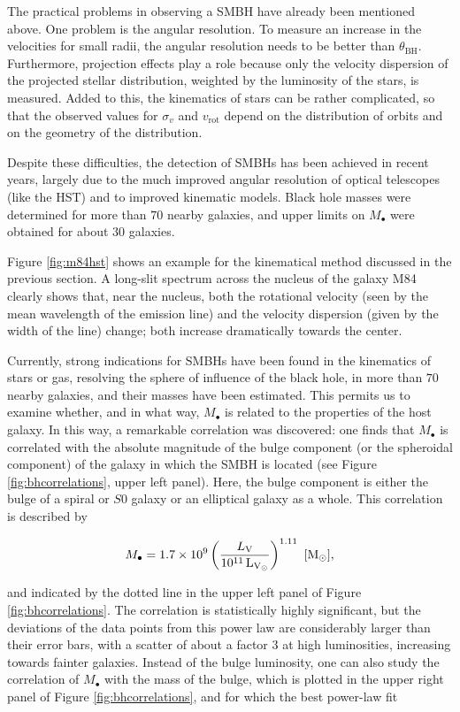 \documentclass[a4paper,10pt]{article}
\begin{document}
{\noindent}The practical problems in observing a SMBH have already been mentioned above. One problem is the angular resolution. To measure an increase in the velocities for small radii, the angular resolution needs to be better than $\theta_\mathrm{BH}$. Furthermore, projection effects play a role because only the velocity dispersion of the projected stellar distribution, weighted by the luminosity of the stars, is measured. Added to this, the kinematics of stars can be rather complicated, so that the observed values for $\sigma_v$ and $v_\mathrm{rot}$ depend on the distribution of orbits and on the geometry of the distribution.

{\noindent}Despite these difficulties, the detection of SMBHs has been achieved in recent years, largely due to the much improved angular resolution of optical telescopes (like the HST) and to improved kinematic models. Black hole masses were determined for more than $70$ nearby galaxies, and upper limits on $M_\bullet$ were obtained for about $30$ galaxies.

{\noindent}Figure \ref{fig:m84hst} shows an example for the kinematical method discussed in the previous section. A long-slit spectrum across the nucleus of the galaxy M84 clearly shows that, near the nucleus, both the rotational velocity (seen by the mean wavelength of the emission line) and the velocity dispersion (given by the width of the line) change; both increase dramatically towards the center.

{\noindent}Currently, strong indications for SMBHs have been found in the kinematics of stars or gas, resolving the sphere of influence of the black hole, in more than $70$ nearby galaxies, and their masses have been estimated. This permits us to examine whether, and in what way, $M_\bullet$ is related to the properties of the host galaxy. In this way, a remarkable correlation was discovered: one finds that $M_\bullet$ is correlated with the absolute magnitude of the bulge component (or the spheroidal component) of the galaxy in which the SMBH is located (see Figure \ref{fig:bhcorrelations}, upper left panel). Here, the bulge component is either the bulge of a spiral or $S0$ galaxy or an elliptical galaxy as a whole. This correlation is described by

\begin{align*}
    M_\bullet = 1.7\times10^9\left(\frac{L_\mathrm{V}}{10^{11}\,{\rm L_{V_\odot}}}\right)^{1.11} ~ [{\rm M_\odot}],
\end{align*}

{\noindent}and indicated by the dotted line in the upper left panel of Figure \ref{fig:bhcorrelations}. The correlation is statistically highly significant, but the deviations of the data points from this power law are considerably larger than their error bars, with a scatter of about a factor $3$ at high luminosities, increasing towards fainter galaxies. Instead of the bulge luminosity, one can also study the correlation of $M_\bullet$ with the mass of the bulge, which is plotted in the upper right panel of Figure \ref{fig:bhcorrelations}, and for which the best power-law fit
\end{document}
